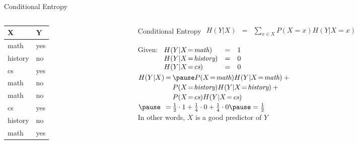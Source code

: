 \documentclass[12pt]{beamer}
\newcommand{\EM}[1]{\mbox{\em#1}}
\begin{document}
\begin{frame}{Conditional Entropy}
	\begin{columns}
		\begin{column}{1.1in}
			\begin{tabular}{ll}
				X               & Y   \\
				\hline
				math            & yes \\
				history         & no  \\
				cs              & yes \\
				math            & no  \\
				math            & no  \\
				cs              & yes \\
				history         & no  \\
				math            & yes \\
			\end{tabular}
		\end{column}
		\begin{column}{3.1in}
			\begin{block}{Conditional Entropy}
				$
				\begin{array}{lll}
					H(Y|X) & = & \sum\limits_{x \in X}P(X\!=\!x)H(Y|X\!=\!x)
				\end{array}
				$
			\end{block}
			\pause
			\small
			Given:
			$
			\begin{array}[t]{lll}
			H(Y|X\!=\!\EM{math})    & = & 1 \\
			H(Y|X\!=\!\EM{history}) & = & 0 \\
			H(Y|X\!=\!\EM{cs})      & = & 0 \\
			\end{array}
			$ \\
			\smallskip
			\pause
			$
			\extrarowheight=2pt
			\begin{array}{@{}l@{\hspace{2pt}}l@{\hspace{2pt}}l@{}}
				H(Y|X) & = & \pause P(X\!=\!\EM{math}) H(Y|X\!=\!\EM{math}) + \mbox{}\\
				       &   & P(X\!=\!\EM{history}) H(Y|X\!=\!\EM{history}) + \mbox{}\\
				       &   & P(X\!=\!\EM{cs}) H(Y|X\!=\!\EM{cs}) \\
				\pause & = & \frac{1}{2} \cdot 1 + \frac{1}{4} \cdot 0 + \frac{1}{4} \cdot 0 \pause = \frac{1}{2}\\
				
			\end{array}
			$ \\
			\medskip
			\pause
			In other words, $X$ is a good predictor of $Y$
		\end{column}
	\end{columns}
\end{frame}
\end{document}
